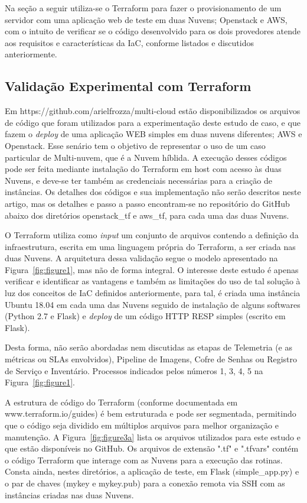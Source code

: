 \documentclass[12pt]{article}
\begin{document}
	Na seção a seguir utiliza-se o Terraform para fazer o provisionamento de um servidor com uma aplicação web de teste em duas Nuvens; Openstack e AWS, com o intuito de verificar se o código desenvolvido para os dois provedores atende aos requisitos e características da IaC, conforme listados e discutidos anteriormente.  
	
	\subsection{Validação Experimental com Terraform}
		
	Em https://github.com/arielfrozza/multi-cloud estão disponibilizados os arquivos de código que foram utilizados para a experimentação deste estudo de caso, e que fazem o \textit{deploy} de uma aplicação WEB simples em duas nuvens diferentes; AWS e Openstack. Esse senário tem o objetivo de representar o uso de um caso particular de Multi-nuvem, que é a Nuvem híblida. A execução desses códigos pode ser feita mediante instalação do Terraform em host com acesso às duas Nuvens, e deve-se ter também as credenciais necessárias para a criação de instâncias. Os detalhes dos códigos e sua implementação não serão descritos neste artigo, mas os detalhes e passo a passo encontram-se no repositório do GitHub abaixo dos diretórios openstack\_tf e aws\_tf, para cada uma das duas Nuvens.
	
	O Terraform utiliza como \textit{input} um conjunto de arquivos contendo a definição da infraestrutura, escrita em uma linguagem própria do Terraform, a ser criada nas duas Nuvens. A arquitetura dessa validação segue o modelo apresentado na Figura~\ref{fig:figure1}, mas não de forma integral. O interesse deste estudo é apenas verificar e identificar as vantagens e também as limitações do uso de tal solução à luz dos conceitos de IaC definidos anteriormente, para tal, é criada uma instância Ubuntu 18.04 em cada uma das Nuvens seguido de instalação de alguns softwares (Python 2.7 e Flask) e \textit{deploy} de um código HTTP RESP simples (escrito em Flask).
	
	Desta forma, não serão abordadas nem discutidas as etapas de Telemetria	(e as métricas ou SLAs envolvidos), Pipeline de Imagens, Cofre de Senhas ou Registro de Serviço e Inventário. Processos indicados pelos números 1, 3, 4, 5 na Figura~\ref{fig:figure1}.
	
	A estrutura de código do Terraform (conforme documentada em www.terraform.io/guides) é bem estruturada e pode ser segmentada, permitindo que o código seja dividido em múltiplos arquivos para melhor organização e manutenção. A Figura~\ref{fig:figure3a} lista os arquivos utilizados para este estudo e que estão disponíveis no GitHub. Os arquivos de extensão ".tf" e ".tfvars" contém o código Terraform que interage com as Nuvens para a execução das rotinas. Consta ainda, nestes diretórios, a aplicação de teste, em Flask (simple\_app.py) e o par de chaves (mykey e mykey.pub) para a conexão remota via SSH com as instâncias criadas nas duas Nuvens.  
	
\end{document}
